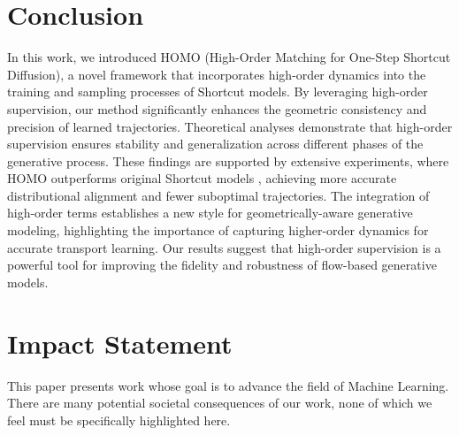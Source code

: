 \section{Conclusion} \label{sec:conclusion}

In this work, we introduced HOMO (High-Order Matching for One-Step Shortcut Diffusion), a novel framework that incorporates high-order dynamics into the training and sampling processes of Shortcut models. By leveraging high-order supervision, our method significantly enhances the geometric consistency and precision of learned trajectories.
Theoretical analyses demonstrate that high-order supervision ensures stability and generalization across different phases of the generative process. These findings are supported by extensive experiments, where HOMO outperforms original Shortcut models \cite{fhla24}, achieving more accurate distributional alignment and fewer suboptimal trajectories.
The integration of high-order terms establishes a new style for geometrically-aware generative modeling, highlighting the importance of capturing higher-order dynamics for accurate transport learning. Our results suggest that high-order supervision is a powerful tool for improving the fidelity and robustness of flow-based generative models. 

\ifdefined\isarxiv
\else
\section*{Impact Statement}
This paper presents work whose goal is to advance the field of Machine Learning. There are many potential societal consequences of our work, none of which we feel must be specifically highlighted here.
\fi
